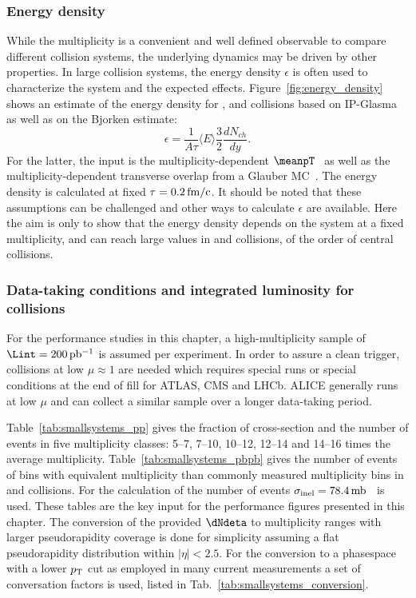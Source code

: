 \documentclass[../report.tex]{subfiles}
\begin{document}
\subsubsection{Energy density}
While the multiplicity is a convenient and well defined observable to compare different collision systems, the underlying dynamics may be driven by other properties. In large collision systems, the energy density $\epsilon$ is often used to characterize the system and the expected effects. Figure~\ref{fig:energy_density} shows an estimate of the energy density for \pp, \pPb and \PbPb collisions based on IP-Glasma~\cite{Bzdak:2013zma} as well as on the Bjorken estimate:
\begin{equation}
  \epsilon = \frac{1}{A \tau} \langle E \rangle \frac{3}{2} \frac{dN_{ch}}{dy}.
\end{equation}
For the latter, the input is the multiplicity-dependent $\meanpT$~\cite{Abelev:2013bla,Acharya:2018njl} as well as the multiplicity-dependent transverse overlap from a Glauber MC~\cite{Loizides:2017ack}. The energy density is calculated at fixed $\tau = \unit[0.2]{fm/c}$. It should be noted that these assumptions can be challenged and other ways to calculate $\epsilon$ are available. Here the aim is only to show that the energy density depends on the system at a fixed multiplicity, and can reach large values in \pp and \pPb collisions, of the order of central \PbPb collisions.

\subsubsection{Data-taking conditions and integrated luminosity for \pp collisions}
For the performance studies in this chapter, a high-multiplicity sample of $\Lint = \unit[200]{pb^{-1}}$ is assumed per experiment. In order to assure a clean trigger, collisions at low $\mu \approx 1$ are needed which requires special runs or special conditions at the end of fill for ATLAS, CMS and LHCb. ALICE generally runs at low $\mu$ and can collect a similar sample over a longer data-taking period.

Table~\ref{tab:smallsystems_pp} gives the fraction of cross-section and the number of events in five multiplicity classes:  5--7, 7--10, 10--12, 12--14 and 14--16 times the average multiplicity. Table~\ref{tab:smallsystems_pbpb} gives the number of events of bins with equivalent multiplicity than commonly measured multiplicity bins in \pPb and \PbPb collisions. For the calculation of the number of events $\sigma_{\rm inel} = \unit[78.4]{mb}$~\cite{Loizides:2017ack} is used. These tables are the key input for the performance figures presented in this chapter. 
The conversion of the provided $\dNdeta$ to multiplicity ranges with larger pseudorapidity coverage is done for simplicity assuming a flat pseudorapidity distribution within $|\eta| < 2.5$. For the conversion to a phasespace with a lower $p\sb{\scriptstyle\mathrm{T}}$ cut as employed in many current measurements a set of conversation factors is used, listed in Tab.~\ref{tab:smallsystems_conversion}.
\end{document}
